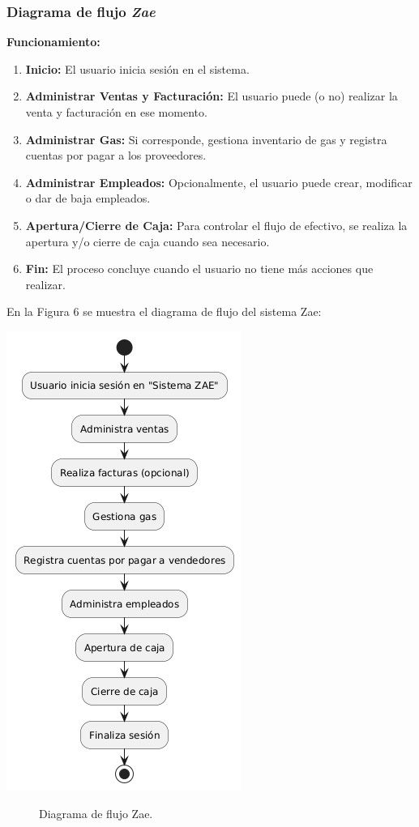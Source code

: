 \documentclass[protocolo.tex]{subfiles}
\begin{document}
\subsubsection{Diagrama de flujo \textit{Zae}} 
\textbf{Funcionamiento:}
\begin{enumerate}
    \item \textbf{Inicio: }  
    El usuario inicia sesión en el sistema.
    \item \textbf{Administrar Ventas y Facturación:}  
    El usuario puede (o no) realizar la venta y facturación en ese momento.
    \item \textbf{Administrar Gas:}  
    Si corresponde, gestiona inventario de gas y registra cuentas por pagar a los proveedores.
    \item \textbf{Administrar Empleados:} 
    Opcionalmente, el usuario puede crear, modificar o dar de baja empleados.
    \item \textbf{Apertura/Cierre de Caja:} 
    Para controlar el flujo de efectivo, se realiza la apertura y/o cierre de caja cuando sea necesario.
    \item \textbf{Fin:}
    El proceso concluye cuando el usuario no tiene más acciones que realizar.  
\end{enumerate}

En la Figura 6 se muestra el diagrama de flujo del sistema Zae:\vspace{4mm}


\begin{center}
\includegraphics[scale=0.6]{Imagenes/Pdf/zaeF.png}
\end{center}
\begin{figure}[h]  %
    \centering
    \caption{Diagrama de flujo Zae.}
    \label{fig:mi-figura6}
\end{figure}
\end{document}
